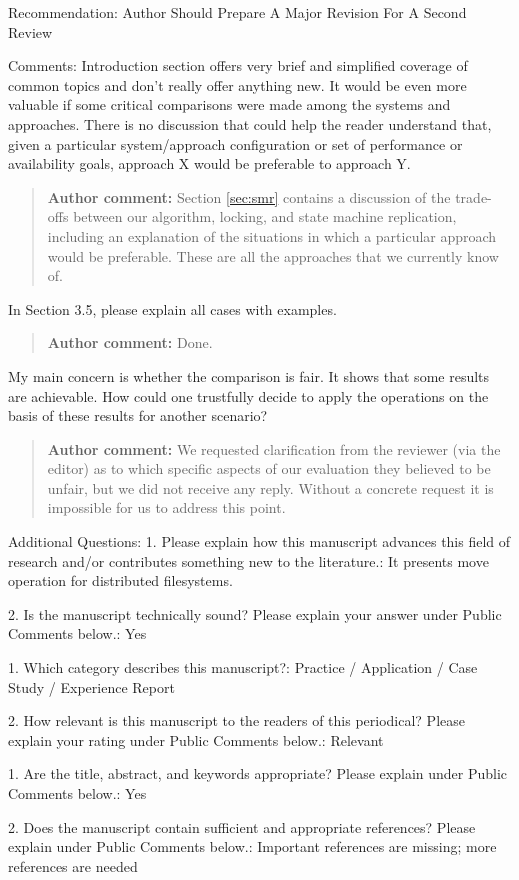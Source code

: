 \documentclass[10pt]{article}
\newcommand{\authorcomment}[1]{\begin{quote}\textbf{Author comment:} #1\end{quote}}
\begin{document}
\begin{spverbatim}
Recommendation: Author Should Prepare A Major Revision For A Second Review

Comments:
Introduction section offers very brief and simplified coverage of common topics and don't really offer anything new.
It would be even more valuable if some critical comparisons were made among the systems and approaches. There is no discussion that could help the reader understand that, given a particular system/approach configuration or set of performance or availability goals, approach X would be preferable to approach Y.
\end{spverbatim}
\authorcomment{Section \ref{sec:smr} contains a discussion of the trade-offs between our algorithm, locking, and state machine replication, including an explanation of the situations in which a particular approach would be preferable.
These are all the approaches that we currently know of.}
\begin{spverbatim}
In Section 3.5, please explain all cases with examples.
\end{spverbatim}
\authorcomment{Done.}
\begin{spverbatim}
My main concern is whether the comparison is fair. It shows that some results are achievable. How could one trustfully decide to apply the operations on the basis of these results for another scenario?
\end{spverbatim}
\authorcomment{We requested clarification from the reviewer (via the editor) as to which specific aspects of our evaluation they believed to be unfair, but we did not receive any reply.
Without a concrete request it is impossible for us to address this point.}
\begin{spverbatim}

Additional Questions:
1.  Please explain how this manuscript advances this field of research and/or contributes something new to the literature.: It presents move operation for distributed filesystems.

2. Is the manuscript technically sound? Please explain your answer under Public Comments below.: Yes

1. Which category describes this manuscript?: Practice / Application / Case Study / Experience Report

2. How relevant is this manuscript to the readers of this periodical? Please explain your rating under Public Comments below.: Relevant

1. Are the title, abstract, and keywords appropriate? Please explain under Public Comments below.: Yes

2. Does the manuscript contain sufficient and appropriate references? Please explain under Public Comments below.: Important references are missing; more references are needed
\end{spverbatim}
\end{document}
